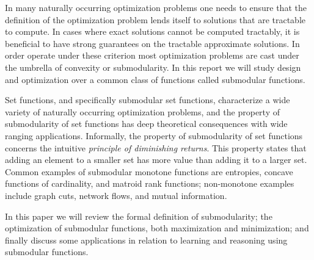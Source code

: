In many naturally occurring optimization problems one needs to ensure that the definition of the optimization problem lends itself to solutions that are tractable to compute. In cases where exact solutions cannot be computed tractably, it is beneficial to have strong guarantees on the tractable approximate solutions. In order operate under these criterion most optimization problems are cast under the umbrella of convexity or submodularity. In this report we will study design and optimization over a common class of functions called submodular functions.

Set functions, and specifically submodular set functions, characterize a wide variety of naturally occurring optimization problems, and the property of submodularity of set functions has deep theoretical consequences with wide ranging applications. Informally, the property of submodularity of set functions concerns the intuitive \textit{principle of diminishing returns}. This property states that adding an element to a smaller set has more value than adding it to a larger set. Common examples of submodular monotone functions are entropies, concave functions of cardinality, and matroid rank functions; non-monotone examples include graph cuts, network flows, and mutual information.

In this paper we will review the formal definition of submodularity; the optimization of submodular functions, both maximization and minimization; and finally discuss some applications in relation to learning and reasoning using submodular functions.